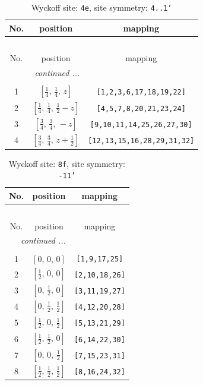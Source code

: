 \documentclass[fleqn,8pt]{jsarticle}
\begin{document}
\renewcommand{\arraystretch}{1.2}
\begin{longtable}{ccc}
\caption{Wyckoff site: {\tt 4e}, site symmetry: {\tt 4..1'}}
 \\
 \hline \hline
No. & position & mapping \\ \hline \endfirsthead

\multicolumn{2}{l}{\tablename\ \thetable{}} \\
 \hline \hline
No. & position & mapping \\ \hline \endhead

 \hline \hline
\multicolumn{2}{r}{\footnotesize\it continued ...} \\ \endfoot

 \hline \hline
\multicolumn{2}{r}{} \\ \endlastfoot

1 & $\left[ \frac{1}{4},\, \frac{1}{4},\, z \right]$ & {\tt [1,2,3,6,17,18,19,22]} \\ \hline
2 & $\left[ \frac{1}{4},\, \frac{1}{4},\, \frac{1}{2} - z \right]$ & {\tt [4,5,7,8,20,21,23,24]} \\ \hline
3 & $\left[ \frac{3}{4},\, \frac{3}{4},\, - z \right]$ & {\tt [9,10,11,14,25,26,27,30]} \\ \hline
4 & $\left[ \frac{3}{4},\, \frac{3}{4},\, z + \frac{1}{2} \right]$ & {\tt [12,13,15,16,28,29,31,32]} \\
\end{longtable}
\renewcommand{\arraystretch}{1.2}
\begin{longtable}{ccc}
\caption{Wyckoff site: {\tt 8f}, site symmetry: {\tt -11'}}
 \\
 \hline \hline
No. & position & mapping \\ \hline \endfirsthead

\multicolumn{2}{l}{\tablename\ \thetable{}} \\
 \hline \hline
No. & position & mapping \\ \hline \endhead

 \hline \hline
\multicolumn{2}{r}{\footnotesize\it continued ...} \\ \endfoot

 \hline \hline
\multicolumn{2}{r}{} \\ \endlastfoot

1 & $\left[ 0,\, 0,\, 0 \right]$ & {\tt [1,9,17,25]} \\ \hline
2 & $\left[ \frac{1}{2},\, 0,\, 0 \right]$ & {\tt [2,10,18,26]} \\ \hline
3 & $\left[ 0,\, \frac{1}{2},\, 0 \right]$ & {\tt [3,11,19,27]} \\ \hline
4 & $\left[ 0,\, \frac{1}{2},\, \frac{1}{2} \right]$ & {\tt [4,12,20,28]} \\ \hline
5 & $\left[ \frac{1}{2},\, 0,\, \frac{1}{2} \right]$ & {\tt [5,13,21,29]} \\ \hline
6 & $\left[ \frac{1}{2},\, \frac{1}{2},\, 0 \right]$ & {\tt [6,14,22,30]} \\ \hline
7 & $\left[ 0,\, 0,\, \frac{1}{2} \right]$ & {\tt [7,15,23,31]} \\ \hline
8 & $\left[ \frac{1}{2},\, \frac{1}{2},\, \frac{1}{2} \right]$ & {\tt [8,16,24,32]} \\
\end{longtable}
\end{document}

